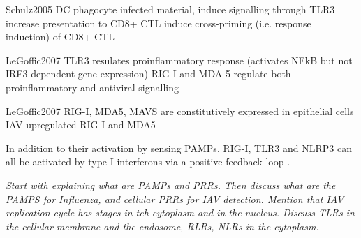 		Schulz2005
		DC phagocyte infected material, induce signalling through TLR3
		increase presentation to CD8+ CTL
		induce cross-priming (i.e. response induction) of CD8+ CTL
		
		LeGoffic2007
		TLR3 resulates proinflammatory response (activates NFkB but not IRF3 dependent gene expression)
		RIG-I and MDA-5 regulate both proinflammatory and antiviral signalling
		
		
		
		LeGoffic2007
		RIG-I, MDA5, MAVS are constitutively expressed in epithelial cells
		IAV upregulated RIG-I and MDA5
		
		
		
		
		
		In addition to their activation by sensing \gls{PAMP}s, \gls{RIG-I}, \gls{TLR}3 and \gls{NLRP3} can all be activated by type I interferons via a positive feedback loop \parencite{Pothlichet2013}.
		
		
		\textit{Start with explaining what are PAMPs and PRRs. Then discuss what are the PAMPS for Influenza, and cellular PRRs for IAV detection. Mention that IAV replication cycle has stages in teh cytoplasm and in the nucleus. Discuss TLRs in the cellular membrane and the endosome, RLRs, NLRs in the cytoplasm.}
		
